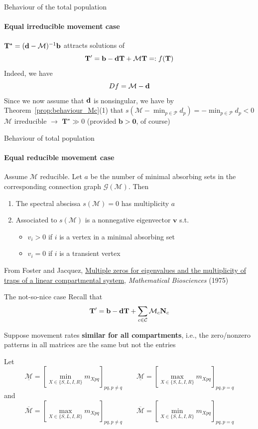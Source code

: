 \documentclass[aspectratio=43]{beamer}
\begin{document}
\begin{frame}{Behaviour of the total population}
\framesubtitle{Equal irreducible movement case}
$\mathbf{T}^\star=(\mathbf{d}-\mathcal{M})^{-1}\mathbf{b}$ attracts solutions of
$$
\mathbf{T}'=\mathbf{b}-\mathbf{d}\mathbf{T}+\mathcal{M}\mathbf{T}=:f(\mathbf{T})
$$
\vfill
Indeed, we have
$$
Df=\mathcal{M}-\mathbf{d}
$$
\vfill
Since we now assume that $\mathbf{d}$ is nonsingular, we have by Theorem~\ref{prop:behaviour_Mc}{(1)} that $s(\mathcal{M}-\min_{p\in\mathcal{P}}d_p)=-\min_{p\in\mathcal{P}}d_p<0$
\vfill
$\mathcal{M}$ irreducible $\rightarrow$ $\mathbf{T}^\star\gg 0$ (provided $\mathbf{b}>\mathbf{0}$, of course)
\end{frame}


\begin{frame}{Behaviour of total population}
\framesubtitle{Equal reducible movement case}
\begin{theorem}
Assume $\mathcal{M}$ reducible. Let $a$ be the number of minimal absorbing sets in the corresponding connection graph $\mathcal{G}(\mathcal{M})$. Then
\begin{enumerate}
	\item The spectral abscissa $s(\mathcal{M})=0$ has multiplicity $a$
	\item Associated to $s(\mathcal{M})$ is a nonnegative eigenvector $\mathbf{v}$ s.t.
	\begin{itemize}
		\item $v_i>0$ if $i$ is a vertex in a minimal absorbing set
		\item $v_i=0$ if $i$ is a transient vertex
	\end{itemize}
\end{enumerate}
\end{theorem}

\vfill
From Foster and Jacquez, \href{https://doi.org/10.1016/0025-5564(75)90096-6}{Multiple zeros for eigenvalues and the multiplicity of traps of a linear compartmental system}, \emph{Mathematical Biosciences} (1975)
\end{frame}


\begin{frame}{The not-so-nice case}
Recall that
$$
\mathbf{T}'=\mathbf{b}-\mathbf{d}\mathbf{T}+\sum_{c\in\mathcal{C}}\mathcal{M}_c\mathbf{N}_{c}
$$

Suppose movement rates \textbf{similar for all compartments}, i.e., the zero/nonzero patterns in all matrices are the same but not the entries

Let
$$
\underline{\mathcal{M}}=\left[\min_{X\in\{S,L,I,R\}}m_{Xpq}\right]_{pq,p\neq q}\qquad 
\underline{\mathcal{M}}=\left[\max_{X\in\{S,L,I,R\}}m_{Xpq}\right]_{pq,p=q}
$$
and
$$
\overline{\mathcal{M}}=\left[\max_{X\in\{S,L,I,R\}}m_{Xpq}\right]_{pq,p\neq q}\qquad
\overline{\mathcal{M}}=\left[\min_{X\in\{S,L,I,R\}}m_{Xpq}\right]_{pq,p=q}
$$
\end{frame}
\end{document}
